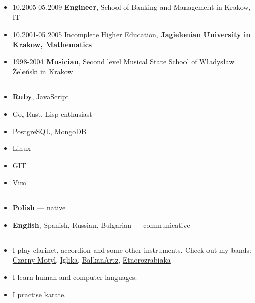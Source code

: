 \documentclass[a4paper]{article}
\begin{document}
\subsection*{}
\begin{itemize}
  \item
    10.2005-05.2009 \textbf{Engineer}, School of Banking and Management in Krakow, IT

  \item
    10.2001-05.2005 Incomplete Higher Education,
    \textbf{Jagielonian University in Krakow, Mathematics}

  \item
    1998-2004 \textbf{Musician},
    Second level Musical State School of Władysław Żeleński in Krakow
\end{itemize}

\subsection*{}
\begin{itemize}
\item
  \textbf{Ruby}, JavaScript
\item
  Go, Rust, Lisp enthusiast
\item
  PostgreSQL, MongoDB
\item
  Linux
\item
  GIT
\item
  Vim
\end{itemize}

\subsection*{}
\begin{itemize}
\item
  \textbf{Polish} --- native
\item
  \textbf{English}, Spanish, Russian, Bulgarian --- communicative
\end{itemize}

\subsection*{}
\begin{itemize}
\item
	I play clarinet, accordion and some other instruments. Check out my bands: \href{https://soundcloud.com/czarny-motyl}{Czarny Motyl}, \href{https://soundcloud.com/iglika-pl}{Iglika}, \href{https://soundcloud.com/user-919481466}{BalkanArtz}, \href{https://soundcloud.com/etnorozrabiaka}{Etnorozrabiaka}
\item
  I learn human and computer languages.
\item
  I practise karate.
\end{itemize}
\end{document}
